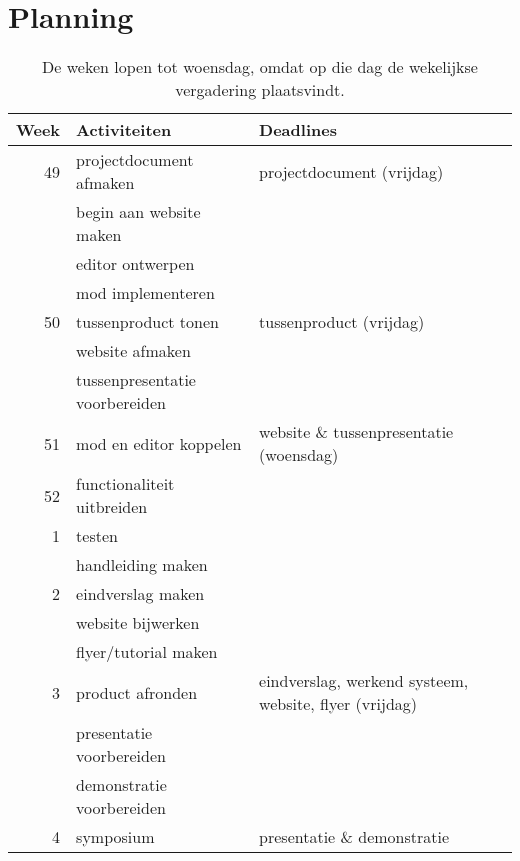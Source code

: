 \documentclass{article}
\begin{document}
\section{Planning}
	\begin{table}[h]
	\begin{tabular}{|r|l|l|}
		\hline
		Week & Activiteiten & Deadlines \\ \hline
		\hline
		49 & projectdocument afmaken & projectdocument (vrijdag) \\
		& begin aan website maken & \\
		& editor ontwerpen & \\
		& mod implementeren & \\ \hline
		50 & tussenproduct tonen & tussenproduct (vrijdag) \\
		& website afmaken & \\
		& tussenpresentatie voorbereiden & \\ \hline
		51 & mod en editor koppelen & website \& tussenpresentatie (woensdag) \\ \hline
		52 & functionaliteit uitbreiden & \\ \hline
		1 & testen & \\
		& handleiding maken & \\ \hline
		2 & eindverslag maken & \\
		& website bijwerken & \\
		& flyer/tutorial maken & \\ \hline
		3 & product afronden & eindverslag, werkend systeem, website, flyer (vrijdag) \\
		& presentatie voorbereiden & \\
		& demonstratie voorbereiden & \\ \hline
		4 & symposium & presentatie \& demonstratie \\ \hline
	\end{tabular}
	\caption{De weken lopen tot woensdag, omdat op die dag de wekelijkse vergadering plaatsvindt.}
	\end{table}
\end{document}
